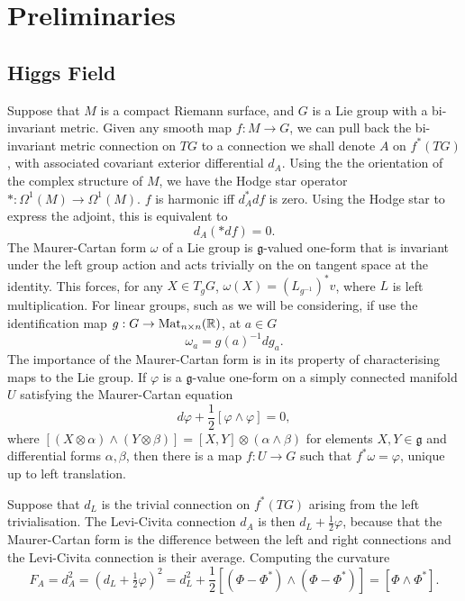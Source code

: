 
\section{Preliminaries}
\label{sec:Preliminaries}

\stoptocentries

\subsection{Higgs Field}

Suppose that $M$ is a compact Riemann surface, and $G$ is a Lie group with a bi-invariant metric. Given any smooth map $f: M\to G$, we can pull back the bi-invariant metric connection on $TG$ to a connection we shall denote $A$ on $f^*(TG)$, with associated covariant exterior differential $d_A$. Using the the orientation of the complex structure of $M$, we have the Hodge star operator $* : Ω^1(M) \to Ω^1(M)$. $f$ is harmonic iff $d_A^* df$ is zero. Using the Hodge star to express the adjoint, this is equivalent to
\[
d_A (* df) = 0.
\]
The Maurer-Cartan form $ω$ of a Lie group is $\mathfrak{g}$-valued one-form that is invariant under the left group action and acts trivially on the on tangent space at the identity. This forces, for any $X\in T_gG$, $ω(X) = (L_{g^{-1}})^*v$, where $L$ is left multiplication. For linear groups, such as we will be considering, if use the identification map $g:G \to \operatorname{Mat}_{n\times n}(\mathbb{R})$, at $a\in G$
\[
ω_a = g(a)^{-1} dg_a.
\]
The importance of the Maurer-Cartan form is in its property of characterising maps to the Lie group. If $φ$ is a $\mathfrak{g}$-value one-form on a simply connected manifold $U$ satisfying the Maurer-Cartan equation
\[
dφ + \frac{1}{2}[φ\wedge φ] = 0,
\]
where $[(X\otimes α) \wedge (Y\otimes β)] = [X,Y]\otimes(α\wedge β)$ for elements $X,Y\in\mathfrak{g}$ and differential forms $α,β$, then there is a map $f:U \to G$ such that $f^*ω = φ$, unique up to left translation.

Suppose that $d_L$ is the trivial connection on $f^*(TG)$ arising from the left trivialisation. The Levi-Civita connection $d_A$ is then $d_L + \tfrac{1}{2}φ$, because that the Maurer-Cartan form is the difference between the left and right connections and the Levi-Civita connection is their average. Computing the curvature
\[
F_A = d_A^2
= (d_L + \tfrac{1}{2}φ)^2
= d_L^2 + \frac{1}{2}[(Φ - Φ^*) \wedge (Φ - Φ^*)]
= [Φ \wedge Φ^*].
\]

